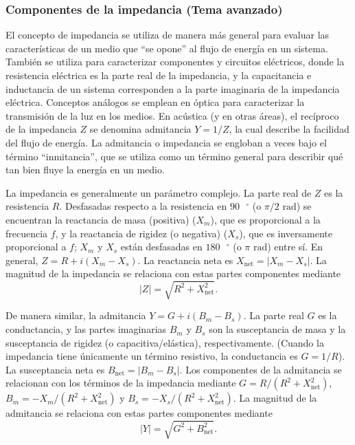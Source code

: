 \documentclass[12pt]{book}
\begin{document}
\subsubsection*{Componentes de la impedancia (Tema avanzado)}

El concepto de impedancia se utiliza de manera más general para evaluar las características de un medio que ``se opone'' al flujo de energía en un sistema. También se utiliza para caracterizar componentes y circuitos eléctricos, donde la resistencia eléctrica es la parte real de la impedancia, y la capacitancia e inductancia de un sistema corresponden a la parte imaginaria de la impedancia eléctrica. Conceptos análogos se emplean en óptica para caracterizar la transmisión de la luz en los medios. En acústica (y en otras áreas), el recíproco de la impedancia $Z$ se denomina admitancia $Y = 1/Z$, la cual describe la facilidad del flujo de energía. La admitancia o impedancia se engloban a veces bajo el término ``inmitancia'', que se utiliza como un término general para describir qué tan bien fluye la energía en un medio.

La impedancia es generalmente un parámetro complejo. La parte real de $Z$ es la resistencia $R$. Desfasadas respecto a la resistencia en $90\text{ }^{\circ}$ (o $\pi/2\text{ rad}$) se encuentran la reactancia de masa (positiva) ($X_m$), que es proporcional a la frecuencia $f$, y la reactancia de rigidez (o negativa) ($X_s$), que es inversamente proporcional a $f$; $X_m$ y $X_s$ están desfasadas en $180\text{ }^{\circ}$ (o $\pi\text{ rad}$) entre sí. En general, $Z = R + i(X_m - X_s)$. La reactancia neta es $X_{\text{net}} = |X_m - X_s|$. La magnitud de la impedancia se relaciona con estas partes componentes mediante
\begin{equation}
|Z| = \sqrt{R^2 + X_{\text{net}}^2}.
\label{eq:10.19}
\end{equation}

De manera similar, la admitancia $Y = G + i(B_m - B_s)$. La parte real $G$ es la conductancia, y las partes imaginarias $B_m$ y $B_s$ son la susceptancia de masa y la susceptancia de rigidez (o capacitiva/elástica), respectivamente. (Cuando la impedancia tiene únicamente un término resistivo, la conductancia es $G = 1/R$). La susceptancia neta es $B_{\text{net}} = |B_m - B_s|$. Los componentes de la admitancia se relacionan con los términos de la impedancia mediante $G = R/(R^2 + X_{\text{net}}^2)$, $B_m = -X_m/(R^2 + X_{\text{net}}^2)$ y $B_s = -X_s/(R^2 + X_{\text{net}}^2)$. La magnitud de la admitancia se relaciona con estas partes componentes mediante
\begin{equation}
|Y| = \sqrt{G^2 + B_{\text{net}}^2}.
\label{eq:10.20}
\end{equation}
\end{document}
